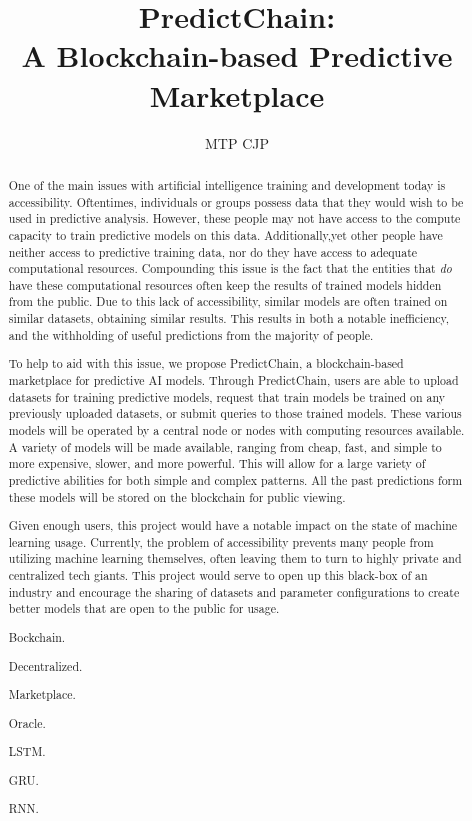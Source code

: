 \documentclass{ledger}
\title{PredictChain:\\
A Blockchain-based Predictive Marketplace}
\author{
    MTP
    CJP
}
\begin{document}
\maketitle

\thispagestyle{pagefirst}

\begin{abstract}
One of the main issues with artificial intelligence training and development today is accessibility. Oftentimes,
individuals or groups possess data that they would wish to be used in predictive analysis. However, these people
may not have access to the compute capacity to train predictive models on this data.  Additionally,yet other
people have neither access to predictive training data, nor do they have access to adequate computational resources.
Compounding this issue is the fact that the entities that \textit{do} have these computational resources often keep the results of
trained models hidden from the public.  Due to this lack of accessibility, similar models are often trained on similar datasets,
obtaining similar results.  This results in both a notable inefficiency, and the withholding of useful predictions from
the majority of people.

To help to aid with this issue, we propose PredictChain, a blockchain-based marketplace for predictive AI models.
Through PredictChain, users are able to upload datasets for training predictive models, request that train models
be trained on any previously uploaded datasets, or submit queries to those trained models.
These various models will be operated by a central node or nodes with computing resources available. A variety of
models will be made available, ranging from cheap, fast, and simple to more expensive, slower, and more powerful.
This will allow for a large variety of predictive abilities for both simple and complex patterns.  All the past predictions
form these models will be stored on the blockchain for public viewing.

Given enough users, this project would have a notable impact on the state of machine learning usage.  Currently,
the problem of accessibility prevents many people from utilizing machine learning themselves, often leaving them to
turn to highly private and centralized tech giants.  This project would serve to open up this black-box of
an industry and encourage the sharing of datasets and parameter configurations to create better models that are open
to the public for usage.

\begin{keywords}
\item Bockchain.
\item Decentralized.
\item Marketplace.
\item Oracle.
\item LSTM.
\item GRU.
\item RNN.
\end{keywords}
\end{abstract}
\end{document}
